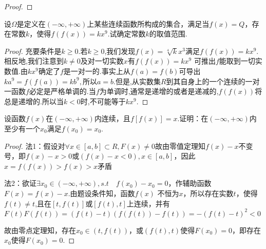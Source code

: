 \begin{xiti}
\begin{proof}
\end{proof}
\item 设$\Omega$是定义在$(-\infty,+\infty)$上某些连续函数所构成的集合，满足当$f(x)=Q$，存在常数$k$，使得$f ( f ( x ) ) = k x ^ { 9 }$.试确定常数$k$的取值范围.
\begin{proof}
	充要条件是$k \ge 0$.若$k \ge 0 $,我们发现$ f(x) =\sqrt[4]{k}x^3 $满足$f(f(x)) = kx^9 $. 相反地,我们注意到$ k\not =0 $及对一切实数$ x $有$ f(f(x)) = kx^9 $ 可推出$ f $能取到一切实数值.由$ kx^9 $确定了$ f $是一对一的.事实上从$ f(a) = f(b) $可导出 $ ka^9= f(f(a)) = kb^9, $所以$ a = b. $但是,从实数集$ R $到其自身上的一个连续的一对一函数$ f $必定是严格单调的.当$f$为单调时,通常是递增的或者是递减的,$ f(f(x)) $将总是递增的.所以当$ k < 0 $时,不可能等于$ kx^9 $.
\end{proof}
\item 设函数$f(x)$在$(-\infty,+\infty)$内连续，且$f[f(x)]=x$.证明：在$(-\infty,+\infty)$内至少有一个$x_{0}$满足$f(x_{0})=x_{0}$.

\begin{proof}
	法1：假设对$\forall x\in [a,b]\subset R,F(x)\not=0$故由零值定理知$f(x)-x$不变号，即$f(x)-x>0\text{或}(f(x)-x<0),x\in [a,b]$，因此$x=f(f(x))>f(x)>x$矛盾
	
	法2：欲证$\exists x_{0} \in (-\infty ,+\infty),s.t\quad f(x_{0})-x_{0}=0$，作辅助函数$F(x)=f(x)-x$.由题设条件知，函数$f(x)$ 不恒为$x$，所以存在实数$t$，使得$f(t)\not =t$,且在$[t,f(t)]\text{或}[f(t),t]$上连续，并有
	$F(t)F(f(t))=(f(t)-t)(f(f(t))-f(t))=-(f(t)-t)^2<0$
	
	故由零点定理知，存在$x_{0}\in (t,f(t))$，或$(f(t),t)$使得$F(x_{0})=0$，即存在$x_{0}$使得$F(x_{0})=0$.

\end{proof}

\end{xiti}

